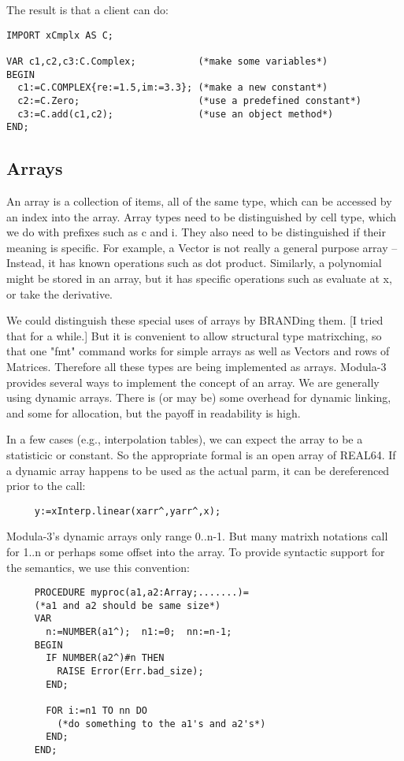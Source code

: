 The result is that a client can do:
\begin{tt} \begin{verbatim}
IMPORT xCmplx AS C;

VAR c1,c2,c3:C.Complex;           (*make some variables*)
BEGIN
  c1:=C.COMPLEX{re:=1.5,im:=3.3}; (*make a new constant*)
  c2:=C.Zero;                     (*use a predefined constant*)
  c3:=C.add(c1,c2);               (*use an object method*)
END;
\end{verbatim} \end{tt}

\subsection{Arrays}
An array is a collection of items, all of the same type,
which can be accessed by an index into the array.  Array
types need to be distinguished by cell type, which we do
with prefixes such as c and i.  They also need to be
distinguished if their meaning is specific.  For example, a
Vector is not really a general purpose array -- Instead, it
has known operations such as dot product.  Similarly, a
polynomial might be stored in an array, but it has specific
operations such as evaluate at x, or take the derivative.

We could distinguish these special uses of arrays by
BRANDing them.  [I tried that for a while.]  But it is
convenient to allow structural type matrixching, so that one
"fmt" command works for simple arrays as well as Vectors and
rows of Matrices.  Therefore all these types are being
implemented as arrays.  Modula-3 provides several ways to
implement the concept of an array.  We are generally using
dynamic arrays.  There is (or may be) some overhead for
dynamic linking, and some for allocation, but the payoff in
readability is high.

In a few cases (e.g., interpolation tables), we can expect
the array to be a statisticic or constant.  So the appropriate
formal is an open array of REAL64.  If a dynamic array
happens to be used as the actual parm, it can be
dereferenced prior to the call:

\begin{tt} \begin{verbatim}
     y:=xInterp.linear(xarr^,yarr^,x);
\end{verbatim} \end{tt}

Modula-3's dynamic arrays only range 0..n-1.  But many matrixh
notations call for 1..n or perhaps some offset into the
array.  To provide syntactic support for the semantics, we
use this convention:
\begin{tt} \begin{verbatim}
     PROCEDURE myproc(a1,a2:Array;.......)=
     (*a1 and a2 should be same size*)
     VAR
       n:=NUMBER(a1^);  n1:=0;  nn:=n-1;
     BEGIN
       IF NUMBER(a2^)#n THEN
         RAISE Error(Err.bad_size);
       END;
     
       FOR i:=n1 TO nn DO
         (*do something to the a1's and a2's*)
       END;
     END;
\end{verbatim} \end{tt}

